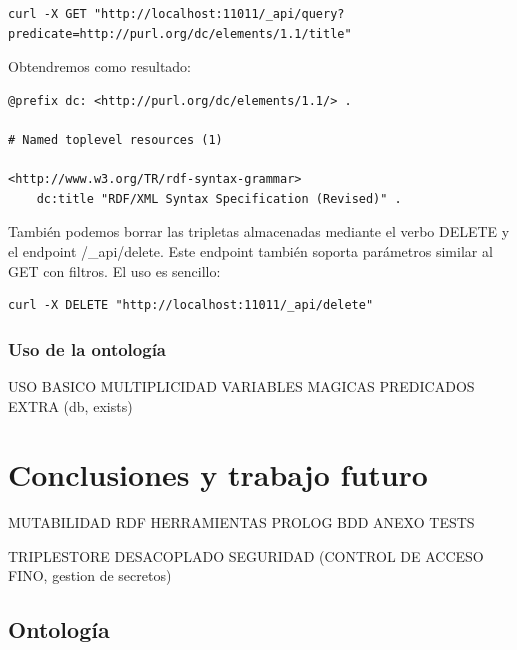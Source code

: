 \documentclass[12pt]{report} %
\begin{document}
\begin{verbatim}
curl -X GET "http://localhost:11011/_api/query?predicate=http://purl.org/dc/elements/1.1/title"
\end{verbatim}

Obtendremos como resultado:
\begin{verbatim}
@prefix dc: <http://purl.org/dc/elements/1.1/> .

# Named toplevel resources (1)

<http://www.w3.org/TR/rdf-syntax-grammar>
    dc:title "RDF/XML Syntax Specification (Revised)" .
\end{verbatim}

También podemos borrar las tripletas almacenadas mediante el verbo DELETE y el endpoint /\_api/delete. Este endpoint también soporta parámetros similar al GET con filtros. El uso es sencillo:

\begin{verbatim}
curl -X DELETE "http://localhost:11011/_api/delete"
\end{verbatim}

\subsection{Uso de la ontología}

USO BASICO
MULTIPLICIDAD
VARIABLES MAGICAS
PREDICADOS EXTRA (db, exists)

\chapter{Conclusiones y trabajo futuro}

MUTABILIDAD RDF
HERRAMIENTAS PROLOG
BDD
ANEXO TESTS

TRIPLESTORE DESACOPLADO
SEGURIDAD (CONTROL DE ACCESO FINO, gestion de secretos)


\begin{appendices}
\chapter{Ontología}

\end{appendices}



\end{document}

